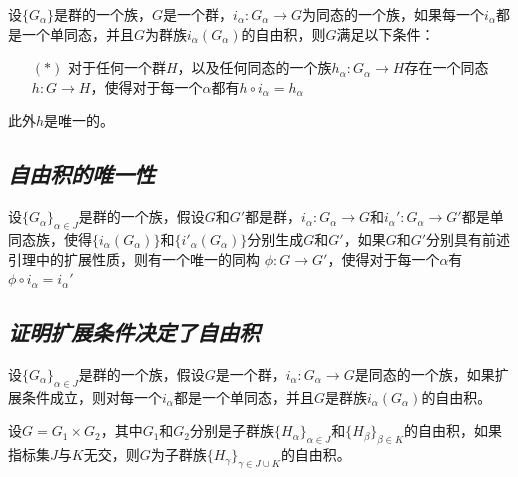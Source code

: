 \begin{mdframed}
    \begin{theorem}
        设$\{G_\alpha\}$是群的一个族，$G$是一个群，$i_\alpha:G_\alpha\rightarrow G$为同态的一个族，如果每一个$i_\alpha$都是一个单同态，并且$G$为群族$i_\alpha(G_\alpha)$的自由积，则$G$满足以下条件：
        \begin{enumerate}[itemindent=2em]
            \item[$(*)$] 对于任何一个群$H$，以及任何同态的一个族$h_\alpha:G_\alpha\rightarrow H$存在一个同态$h:G\rightarrow H$，使得对于每一个$\alpha$都有$h\circ i_\alpha=h_\alpha$
        \end{enumerate}

        此外$h$是唯一的。
    \end{theorem}
\end{mdframed}

\subsection*{\textsl{自由积的唯一性}}

\begin{mdframed}
    \begin{theorem}
         设$\{G_\alpha\}_{\alpha\in J}$是群的一个族，假设$G$和$G'$都是群，$i_\alpha:G_\alpha\rightarrow G$和$i_\alpha':G_\alpha\rightarrow G'$都是单同态族，使得$\{i_\alpha(G_\alpha)\}$和$\{i'_\alpha(G_\alpha)\}$分别生成$G$和$G'$，如果$G$和$G'$分别具有前述引理中的扩展性质，则有一个唯一的同构
        $\phi:G\rightarrow G'$，使得对于每一个$\alpha$有$\phi\circ i_\alpha=i_\alpha'$
    \end{theorem}
\end{mdframed}

\subsection*{\textsl{证明扩展条件决定了自由积}}

\begin{mdframed}
    \begin{lemma}
        设$\{G_\alpha\}_{\alpha\in J}$是群的一个族，假设$G$是一个群，$i_\alpha:G_\alpha\rightarrow G$是同态的一个族，如果扩展条件成立，则对每一个$i_\alpha$都是一个单同态，并且$G$是群族$i_\alpha(G_\alpha)$的自由积。
    \end{lemma}
\end{mdframed}

\begin{mdframed}
    \begin{corollary}
        设$G=G_1\times G_2$，其中$G_1$和$G_2$分别是子群族$\{H_\alpha\}_{\alpha\in J}$和$\{H_\beta\}_{\beta\in K}$的自由积，如果指标集$J$与$K$无交，则$G$为子群族$\{H_\gamma\}_{\gamma\in J\cup K}$的自由积。
    \end{corollary}
\end{mdframed}


